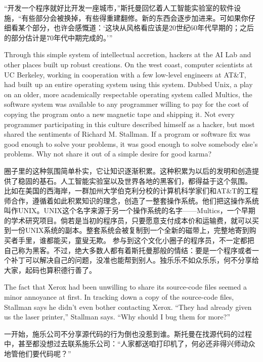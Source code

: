 \ifdefined\chs
``开发一个程序就好比开发一座城市，''斯托曼回忆着人工智能实验室的软件设施，``有些部分会被换掉，有些得重建翻修。新的东西会逐步加进来。可如果你仔细看某个部分，也许会感慨道：`这块从风格看应该是20世纪60年代早期的；之后的部分估计是70年代中期完成的。'\hspace{0.01in}''
\fi

\ifdefined\eng
Through this simple system of intellectual accretion, hackers at the AI Lab and other places built up robust creations.
\ifdefined\vone
On the west coast, computer scientists at UC Berkeley, working in cooperation with a few low-level engineers at AT\&T, had built up an entire operating system using this system. Dubbed Unix, a play on an older, more academically respectable operating system called Multics, the software system was available to any programmer willing to pay for the cost of copying the program onto a new magnetic tape and shipping it.
\fi
Not every programmer participating in this culture described himself as a hacker, but most shared the sentiments of Richard M. Stallman. If a program or software fix was good enough to solve your problems, it was good enough to solve somebody else's problems. Why not share it out of a simple desire for good karma?
\fi

\ifdefined\chs
圈子里的这种氛围简单朴实，它让知识逐渐积累。这种积累为以后的发明和创造提供了稳固的基石。人工智能实验室以及世界各地的黑客们，都得益于这个氛围。
\ifdefined\vone
比如在美国的西海岸，一群加州大学伯克利分校的计算机科学家们和AT\&T的工程师合作，遵循着如此积累知识的理念，创造了一整套操作系统。他们把这操作系统叫作UNIX。UNIX这个名字来源于另一个操作系统的名字——Multics，一个早期的学术研究项目。倘若是当初的程序员，只要愿意支付成本价和运输费，就可以买到一份UNIX系统的副本。整套系统会被复制到一个全新的磁带上，完整地寄到购买者手里，谁都能买，童叟无欺。
\fi
参与到这个文化小圈子的程序员，不一定都把自己称为黑客。不过，绝大多数人都有着斯托曼那般的情结：要是一个程序或者一个补丁可以解决自己的问题，没准也能帮到别人。独乐乐不如众乐乐，何不分享给大家，起码也算积德行善了。
\fi

\ifdefined\vone
\ifdefined\eng
The fact that Xerox had been unwilling to share its source-code files seemed a
minor annoyance at first. In tracking down a copy of the source-code files,
Stallman says he didn't even bother contacting Xerox. ``They had already given
us the laser printer,'' Stallman says. ``Why should I bug them for more?''
\fi

\ifdefined\chs
一开始，施乐公司不分享源代码的行为倒也没惹到谁。斯托曼在找源代码的过程中，甚至都没想过去联系施乐公司：``人家都送咱打印机了，何必还非得兴师动众地管他们要代码呢？''
\fi

